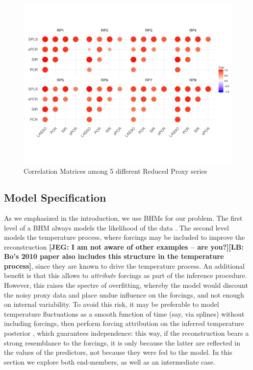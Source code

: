 \documentclass[12pt]{amsart}
\theoremstyle{plain}
\theoremstyle{definition}
\theoremstyle{remark}
\newcommand{\lb}[1]{\color{MidnightBlue}\textbf{[LB: #1]}\normalcolor}
\newcommand{\jeg}[1]{\color{ProcessBlue}\textbf{[JEG: #1]}\normalcolor}
\begin{document}
\begin{figure}
  \centering
 \includegraphics[scale=0.38]{CorMatrixRPs} 
  \caption{Correlation Matrices among 5 different Reduced Proxy series}
  \label{fig:CorrRPs}
\end{figure}


\subsection{Model Specification}
\label{sec:modelspec}
As we emphasized in the introduction, we use BHMs for our problem. The first level of a BHM always models the likelihood of the data \cite{Tingley_QSR2012}. The second level models the temperature process, where forcings may be included to improve
the reconstruction \cite{Barboza2014,boli1} \jeg{I am not aware of other
  examples -- are you?}\lb{Bo's 2010 paper also includes this structure in the
  temperature process}, since they are known to drive the temperature process. An additional benefit is that this allows to {\it attribute} forcings \cite{HegerlZwiers:2011} as part of the inference procedure. However, this raises the spectre of overfitting, whereby the model would discount the noisy proxy data and place undue influence on the forcings, and not enough on internal variability. To avoid this risk, it may be preferable to model temperature fluctuations as a smooth function of time (say, via splines) without including forcings, then perform forcing attribution on the inferred temperature posterior \cite{Schurer:2013aa,Schurer:2013ab}, which guarantees independence: this way, if the reconstruction bears a strong resemblance to the forcings, it is only because the latter are reflected in the values of the predictors, not because they were fed to the model. In this section we explore both end-members, as well as an intermediate case. 
\end{document}
